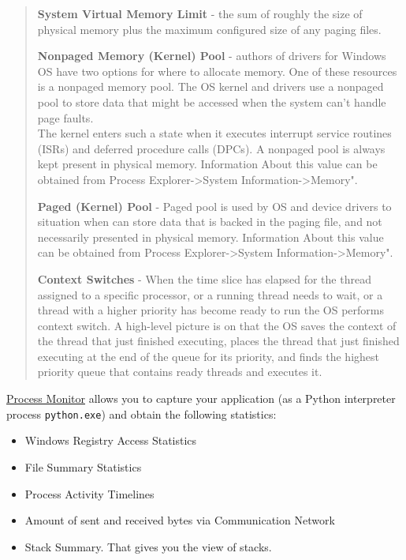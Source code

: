 \documentclass[
]{article}
\begin{document}
\begin{quote}
\textbf{System Virtual Memory Limit} - the sum of roughly the size of
physical memory plus the maximum configured size of any paging files.

\textbf{Nonpaged Memory (Kernel) Pool} - authors of drivers for Windows
OS have two options for where to allocate memory. One of these resources
is a nonpaged memory pool. The OS kernel and drivers use a nonpaged pool
to store data that might be accessed when the system can't handle page
faults. \\
The kernel enters such a state when it executes interrupt service
routines (ISRs) and deferred procedure calls (DPCs). A nonpaged pool is
always kept present in physical memory. Information About this value can
be obtained from Process Explorer-\textgreater System
Information-\textgreater Memory".

\textbf{Paged (Kernel) Pool} - Paged pool is used by OS and device
drivers to situation when can store data that is backed in the paging
file, and not necessarily presented in physical memory. Information
About this value can be obtained from Process
Explorer-\textgreater System Information-\textgreater Memory".

\textbf{Context Switches} - When the time slice has elapsed for the
thread assigned to a specific processor, or a running thread needs to
wait, or a thread with a higher priority has become ready to run the OS
performs context switch. A high-level picture is on that the OS saves
the context of the thread that just finished executing, places the
thread that just finished executing at the end of the queue for its
priority, and finds the highest priority queue that contains ready
threads and executes it.
\end{quote}

\href{https://learn.microsoft.com/en-us/sysinternals/downloads/procmon}{Process
Monitor} allows you to capture your application (as a Python interpreter
process \texttt{python.exe}) and obtain the following statistics:

\begin{itemize}
\item
  Windows Registry Access Statistics
\item
  File Summary Statistics
\item
  Process Activity Timelines
\item
  Amount of sent and received bytes via Communication Network
\item
  Stack Summary. That gives you the view of stacks.
\end{itemize}
\end{document}
